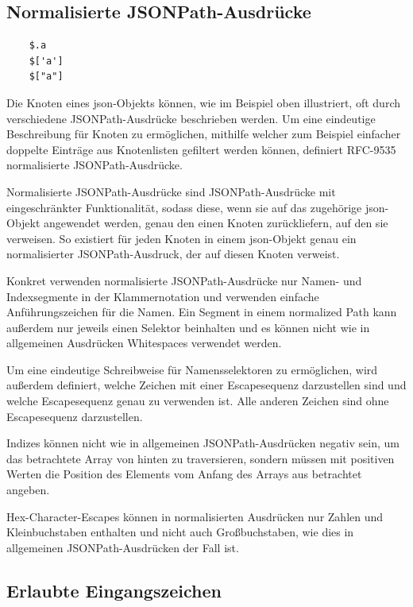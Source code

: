 \documentclass[oneside]{ausarbeitung}
\begin{document}
	
	
	
\subsection{Normalisierte JSONPath-Ausdrücke}
	
\begin{lstlisting}
	$.a
	$['a']
	$["a"]
\end{lstlisting}
	
Die Knoten eines \ac{json}-Objekts können, wie im Beispiel oben illustriert, oft durch verschiedene JSONPath-Ausdrücke beschrieben werden. Um eine eindeutige Beschreibung für Knoten zu ermöglichen, mithilfe welcher zum Beispiel einfacher doppelte Einträge aus Knotenlisten gefiltert werden können, definiert RFC-9535 normalisierte JSONPath-Ausdrücke.
	
Normalisierte JSONPath-Ausdrücke sind JSONPath-Ausdrücke mit eingeschränkter Funktionalität, sodass diese, wenn sie auf das zugehörige \ac{json}-Objekt angewendet werden, genau den einen Knoten zurückliefern, auf den sie verweisen. So existiert für jeden Knoten in einem \ac{json}-Objekt genau ein normalisierter JSONPath-Ausdruck, der auf diesen Knoten verweist. 
	
Konkret verwenden normalisierte JSONPath-Ausdrücke nur Namen- und Indexsegmente in der Klammernotation und verwenden einfache Anführungszeichen für die Namen. Ein Segment in einem normalized Path kann außerdem nur jeweils einen Selektor beinhalten und es können nicht wie in allgemeinen Ausdrücken Whitespaces verwendet werden. 
	
Um eine eindeutige Schreibweise für Namensselektoren zu ermöglichen, wird außerdem definiert, welche Zeichen mit einer Escapesequenz darzustellen sind und welche Escapesequenz genau zu verwenden ist. Alle anderen Zeichen sind ohne Escapesequenz darzustellen.
	
Indizes können nicht wie in allgemeinen JSONPath-Ausdrücken negativ sein, um das betrachtete Array von hinten zu traversieren, sondern müssen mit positiven Werten die Position des Elements vom Anfang des Arrays aus betrachtet angeben.
	
Hex-Character-Escapes können in normalisierten Ausdrücken nur Zahlen und Kleinbuchstaben enthalten und nicht auch Großbuchstaben, wie dies in allgemeinen JSONPath-Ausdrücken der Fall ist.
	
	
	
	
\subsection{Erlaubte Eingangszeichen}
	
\end{document}
